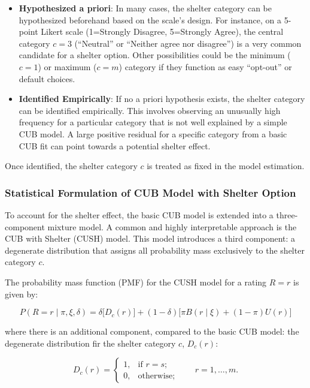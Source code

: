 \documentclass[
  letterpaper,
  DIV=11,
  numbers=noendperiod]{scrartcl}
\providecommand{\tightlist}{%
  \setlength{\itemsep}{0pt}\setlength{\parskip}{0pt}}\usepackage{longtable,booktabs,array}
\begin{document}
\begin{itemize}
\tightlist
\item
  \textbf{Hypothesized a priori}: In many cases, the shelter category
  can be hypothesized beforehand based on the scale's design. For
  instance, on a 5-point Likert scale (1=Strongly Disagree, 5=Strongly
  Agree), the central category \(c=3\) (``Neutral'' or ``Neither agree
  nor disagree'') is a very common candidate for a shelter option. Other
  possibilities could be the minimum (\(c=1\)) or maximum (\(c=m\))
  category if they function as easy ``opt-out'' or default choices.
\item
  \textbf{Identified Empirically}: If no a priori hypothesis exists, the
  shelter category can be identified empirically. This involves
  observing an unusually high frequency for a particular category that
  is not well explained by a simple CUB model. A large positive residual
  for a specific category from a basic CUB fit can point towards a
  potential shelter effect.
\end{itemize}

Once identified, the shelter category \(c\) is treated as fixed in the
model estimation.

\hypertarget{statistical-formulation-of-cub-model-with-shelter-option}{%
\subsubsection{Statistical Formulation of CUB Model with Shelter
Option}\label{statistical-formulation-of-cub-model-with-shelter-option}}

To account for the shelter effect, the basic CUB model is extended into
a three-component mixture model. A common and highly interpretable
approach is the CUB with Shelter (CUSH) model. This model introduces a
third component: a degenerate distribution that assigns all probability
mass exclusively to the shelter category \(c\).

The probability mass function (PMF) for the CUSH model for a rating
\(R=r\) is given by:

\[
 P(R = r\mid \pi, \xi, \delta) = \delta \Big[D_c(r)\Big] + (1-\delta)\Big[\pi B(r \mid \xi) + (1-\pi)U(r)\Big]
\]

where there is an additional component, compared to the basic CUB model:
the degenerate distribution fir the shelter category \(c\), \(D_c(r)\):

\[
D_c(r) =
\begin{cases}
    1, & \text{if } r = s; \\
    0, & \text{otherwise;}
\end{cases}
\qquad r = 1, \dots, m.
\]
\end{document}
